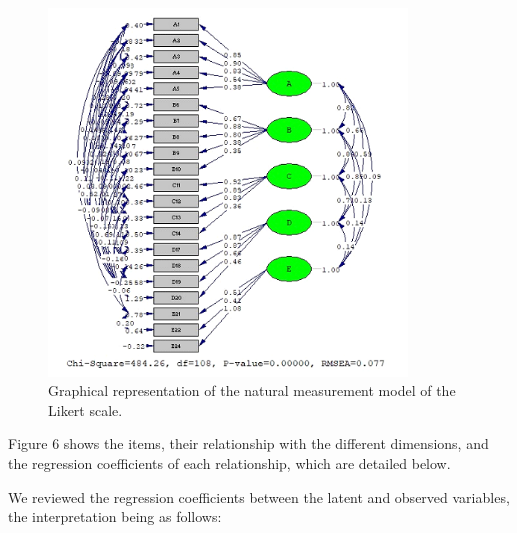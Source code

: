 \documentclass[english]{textolivre}
\begin{document}
\begin{figure}[htbp]
 \centering
 \includegraphics[width=0.85\textwidth]{fig6-2.png}
 \caption{Graphical representation of the natural measurement model of the Likert scale.}
 \label{fig6}
\end{figure}

Figure 6 shows the items, their relationship with the different dimensions, and the regression coefficients of each relationship, which are detailed below.

We reviewed the regression coefficients between the latent and observed variables, the interpretation being as follows:
\end{document}
